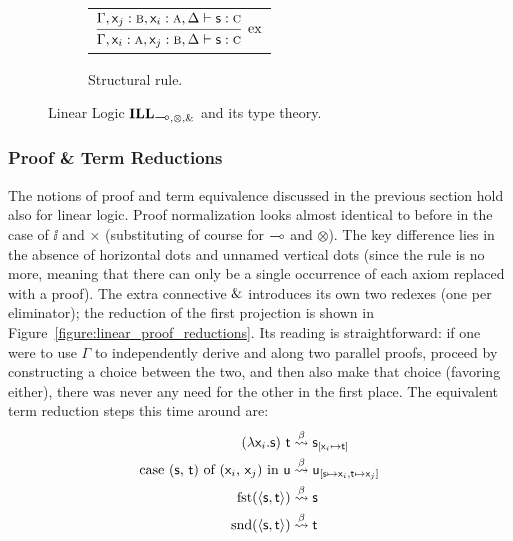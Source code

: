 \begin{figure}
\begin{subfigure}{1\textwidth}
	\end{subfigure}\\[\midsep]
	\begin{subfigure}{1\textwidth}
		\centering
		\begin{tabularx}{0.7\textwidth}{@{}C@{}}
		$
		\infer[\Exchange{}]{\Gamma, \vari: \prop{a}, \varj: \prop{b}, \Delta \vdash \term{s}: \prop{c}}{\Gamma, \varj: \prop{b}, \vari: \prop{a}, \Delta \vdash \term{s}: \prop{c}}
		$
		\end{tabularx}
		\caption{Structural rule.}
		\label{subfigure:linear_logic_rules:structural}
	\end{subfigure}
	\caption{Linear Logic $\ILL_{\li,\otimes,\with}$ and its type theory.}
	\label{figure:linear_logic_rules}
\end{figure}

\subsubsection{Proof \& Term Reductions}
The notions of proof and term equivalence discussed in the previous section hold also for linear logic.
Proof normalization looks almost identical to before in the case of $\ii$ and $\times$ (substituting of course for $\li$ and $\otimes$).
The key difference lies in the absence of horizontal dots and unnamed vertical dots (since the \Contraction{} rule is no more, meaning that there can only be a single occurrence of each axiom replaced with a proof).
The extra connective ${\&}$ introduces its own two redexes (one per eliminator); the reduction of the first projection is shown in Figure~\ref{figure:linear_proof_reductions}. 
Its reading is straightforward: if one were to use $\Gamma$ to independently derive  and  along two parallel proofs, proceed by constructing a choice between the two, and then also make that choice (favoring either), there was never any need for the other in the first place.
The equivalent term reduction steps this time around are:
\begin{align}
(\mathsf{\mathnormal{\lambda} \mathsf{x}_{\mathnormal{i}} .s})~\mathsf{t} & \overset{\beta}{\leadsto} \mathsf{s}_{[\mathsf{\mathsf{x}_{\mathnormal{i}} } \mapsto \mathsf{t}]}\\
\textrm{case (\ensuremath{\mathsf{s}}, \ensuremath{\mathsf{t}}) of (\ensuremath{\mathsf{\mathsf{x}_{\mathnormal{i}} }}, \ensuremath{\mathsf{\mathsf{x}_{\mathnormal{j}}}}) in \ensuremath{\mathsf{u}}} & \overset{\beta}{\leadsto} \mathsf{u_{[\mathsf{s} \mapsto \mathsf{\mathsf{x}_{\mathnormal{i}} }, \mathsf{t} \mapsto \mathsf{\mathsf{x}_{\mathnormal{j}}}]}}\\
\textrm{fst}(\langle\mathsf{s},\mathsf{t}\rangle) & \overset{\beta}{\leadsto} \mathsf{s}\\
\textrm{snd}(\langle\mathsf{s},\mathsf{t}\rangle) & \overset{\beta}{\leadsto} \mathsf{t}
\end{align}


